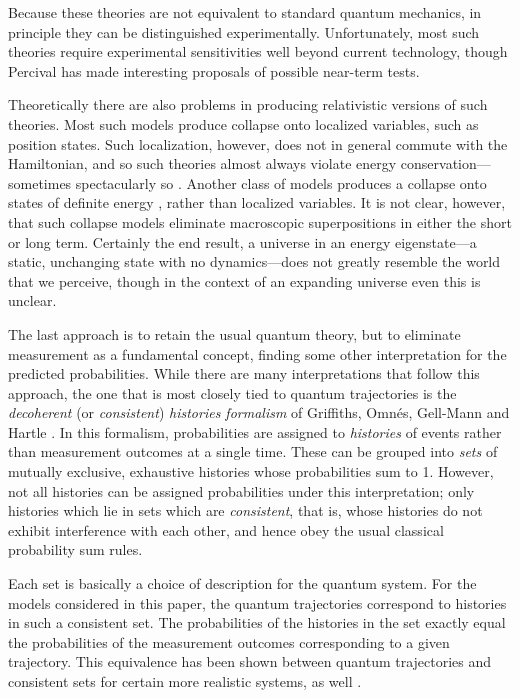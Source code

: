 Because these theories are not equivalent to standard quantum mechanics,
in principle they can be distinguished experimentally.  Unfortunately,
most such theories require experimental sensitivities well beyond current
technology, though Percival \cite{Percival2,Percival3}
has made interesting proposals of possible near-term tests.

Theoretically there are also problems in producing relativistic versions
of such theories.  Most such models produce collapse onto localized
variables, such as position states.  Such localization, however, does not
in general commute with the Hamiltonian, and so such theories almost
always violate energy conservation---sometimes spectacularly so
\cite{Adler}.  Another class of models produces a collapse
onto states of definite energy \cite{Diosi,Penrose,Percival2},
rather than localized variables.  It is not clear, however, that
such collapse models eliminate macroscopic superpositions in either the
short or long term.  Certainly the end result, a universe in an energy
eigenstate---a static, unchanging state with no dynamics---does not
greatly resemble the world that we perceive, though in the context of an
expanding universe even this is unclear.

The last approach is to retain the usual quantum theory, but to eliminate
measurement as a fundamental concept, finding some other interpretation
for the predicted probabilities.  While there are many interpretations
that follow this approach, the one that is most closely tied to quantum
trajectories is the {\it decoherent} (or {\it consistent}) {\it histories
formalism} of Griffiths, Omn\'es, Gell-Mann and Hartle
\cite{Griffiths,Omnes,GellMann}.  In this formalism,
probabilities are assigned to {\it histories} of events rather than
measurement outcomes at a single time.  These can be
grouped into {\it sets} of mutually exclusive, exhaustive histories whose
probabilities sum to 1.  However, not all histories can be assigned
probabilities under this interpretation; only histories which lie in sets
which are {\it consistent}, that is, whose histories do not
exhibit interference with each other, and hence obey the usual
classical probability sum rules.

Each set is basically a choice of description for the quantum system.
For the models considered in this paper, the quantum trajectories correspond
to histories in such a consistent set.  The probabilities of the
histories in the set exactly equal the probabilities of the measurement
outcomes corresponding to a given trajectory.  This equivalence has been
shown between quantum trajectories and consistent sets for certain more
realistic systems, as well \cite{DGHP,Brun1,Brun2}.


